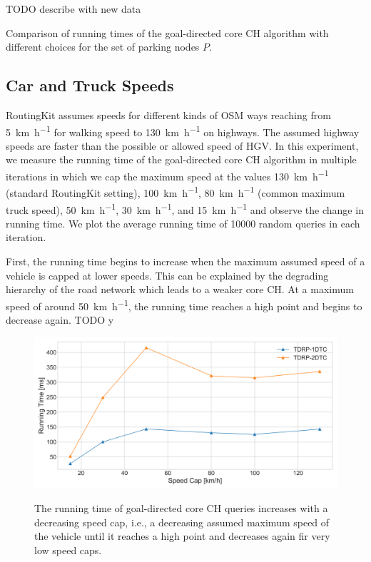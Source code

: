 TODO describe with new data

\begin{table}[hbtp]
	\centering
	
	\caption{Comparison of running times of the goal-directed core CH algorithm with different choices for the set of parking nodes $P$.}
	\label{tbl:parking_set_times}
\end{table}

\subsection{Car and Truck Speeds}
RoutingKit assumes speeds for different kinds of OSM ways reaching from \SI[per-mode = symbol]{5}{\kilo\meter\per\hour} for walking speed to \SI[per-mode = symbol]{130}{\kilo\meter\per\hour} on highways. The assumed highway speeds are faster than the possible or allowed speed of HGV. In this experiment, we measure the running time of the goal-directed core CH algorithm in multiple iterations in which we cap the maximum speed at the values \SI[per-mode = symbol]{130}{\kilo\meter\per\hour} (standard RoutingKit setting), \SI[per-mode = symbol]{100}{\kilo\meter\per\hour}, \SI[per-mode = symbol]{80}{\kilo\meter\per\hour} (common maximum truck speed), \SI[per-mode = symbol]{50}{\kilo\meter\per\hour}, \SI[per-mode = symbol]{30}{\kilo\meter\per\hour}, and \SI[per-mode = symbol]{15}{\kilo\meter\per\hour} and observe the change in running time. We plot the average running time of \num{10000} random queries in each iteration.

First, the running time begins to increase when the maximum assumed speed of a vehicle is capped at lower speeds. This can be explained by the degrading hierarchy of the road network which leads to a weaker core CH. At a maximum speed of around \SI[per-mode = symbol]{50}{\kilo\meter\per\hour}, the running time reaches a high point and begins to decrease again. TODO y

\begin{figure}[hbtp]
	\centering
	\includegraphics[width=.95\textwidth]{plots/thesis_speed_cap.png}
	\label{fig:truck_speed_limit}
	\caption{The running time of goal-directed core CH queries increases with a decreasing speed cap, i.e., a decreasing assumed maximum speed of the vehicle until it reaches a high point and decreases again fir very low speed caps.}
\end{figure}

